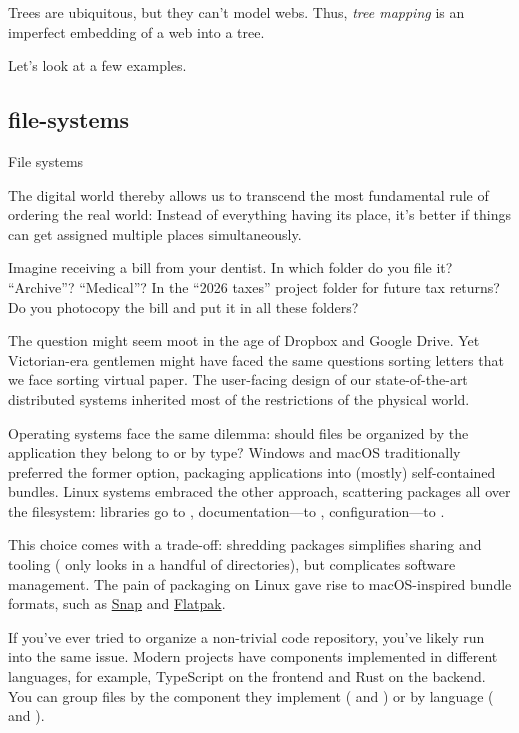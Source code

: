 \documentclass{article}
\begin{document}
Trees are ubiquitous, but they can't model webs.
Thus, \emph{tree mapping} is an imperfect embedding of a web into a tree.

Let's look at a few examples.

\subsection{file-systems}{File systems}

\epigraph{
The digital world thereby allows us to transcend the most fundamental rule of ordering the real world:
Instead of everything having its place,
it's better if things can get assigned multiple places simultaneously.}{}

Imagine receiving a bill from your dentist.
In which folder do you file it?
``Archive''? ``Medical''?
In the ``2026 taxes'' project folder for future tax returns?
Do you photocopy the bill and put it in all these folders?

The question might seem moot in the age of Dropbox and Google Drive.
Yet Victorian-era gentlemen might have faced the same questions sorting letters
that we face sorting virtual paper.
The user-facing design of our state-of-the-art distributed systems inherited most of the restrictions of the physical world.

Operating systems face the same dilemma:
should files be organized by the application they belong to or by type?
Windows and macOS traditionally preferred the former option, packaging applications into (mostly) self-contained bundles.
Linux systems embraced the other approach,
scattering packages all over the filesystem:
libraries go to , documentation---to , configuration---to .

This choice comes with a trade-off:
shredding packages simplifies sharing and tooling
( only looks in a handful of directories),
but complicates software management.
The pain of packaging on Linux gave rise to macOS-inspired bundle formats,
such as \href{https://snapcraft.io/docs}{Snap} and \href{https://flatpak.org/}{Flatpak}.

If you've ever tried to organize a non-trivial code repository,
you've likely run into the same issue.
Modern projects have components implemented in different languages, for example,
TypeScript on the frontend and Rust on the backend.
You can group files by the component they implement ( and ) or by language ( and ).
\end{document}
